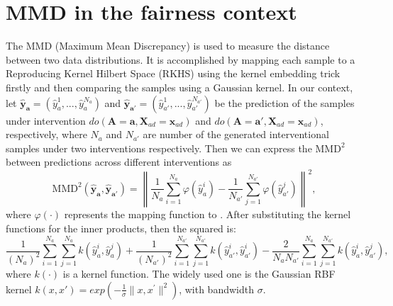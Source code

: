 \documentclass{article} %
\begin{document}
\section{MMD in the fairness context} \label{appendix: MMD}

The MMD (Maximum Mean Discrepancy) is used to measure the distance between two data distributions. It is accomplished by mapping each sample to a Reproducing Kernel Hilbert Space (RKHS) using the kernel embedding trick firstly and then comparing the samples using a Gaussian kernel. In our context, let $\mathbf{\hat{y}_a} = (\hat{y}_a^1,...,\hat{y}_a^{N_a})$ and $\mathbf{\hat{y}_{a'}} = (\hat{y}_{a'}^1,...,\hat{y}_{a'}^{N_{a'}})$ be the prediction of the samples under intervention $do(\mathbf{A}=\mathbf{a},\mathbf{X}_{ad}=\mathbf{x}_{ad})$ and $do(\mathbf{A}=\mathbf{a'},\mathbf{X}_{ad}=\mathbf{x}_{ad})$, respectively, where $N_a$ and $N_{a'}$ are number of the generated interventional samples under two interventions respectively. 
Then we can express the $\text{MMD} ^ 2$ between predictions across different interventions as
\begin{equation*}
    \text{MMD}^2(\mathbf{\hat{y}_a}, \mathbf{\hat{y}_{a'}}) = \left \| \frac{1}{N_a} \sum_{i=1}^{N_a} \varphi (\hat{y}_a^i) - 
    \frac{1}{N_{a'}} \sum_{j=1}^{N_{a'}} \varphi (\hat{y}_{a'}^j) \right\|^2,
\end{equation*}
where $\varphi (\cdot)$ represents the mapping function to . After substituting the kernel functions for the inner products, then the squared  is:
\begin{equation*}
\frac{1}{(N_a)^2}\sum_{i=1}^{N_a}\sum_{j=1}^{N_a}k(\hat{y}_{a}^i, \hat{y}_{a}^j) + \frac{1}{(N_{a'})^2}\sum_{i=1}^{N_{a'}}\sum_{j=1}^{N_{a'}}k(\hat{y}_{a'}^i, \hat{y}_{a'}^i) -
\frac{2}{N_aN_{a'}}\sum_{i=1}^{N_a}\sum_{j=1}^{N_{a'}}k(\hat{y}_{a}^i, \hat{y}_{a'}^j),
\end{equation*}
where $k(\cdot)$ is a kernel function. The widely used one is the Gaussian RBF kernel $k(x, x')=exp(-\frac{1}{\sigma}\|x, x^{'}\|^2)$, with bandwidth $\sigma$. %
\end{document}
